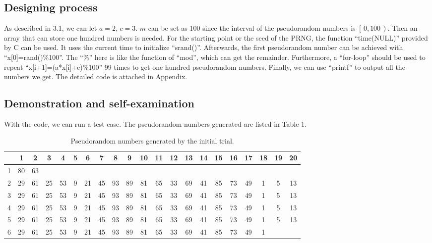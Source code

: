 \documentclass[a4paper]{article}
\begin{document}
	\subsection{Designing process}
	As described in 3.1, we can let $a=2$, $c=3$. $m$ can be set as 100 since the interval of the pseudorandom numbers is $\left[\,0,100\,\right)$. Then an array that can store one hundred numbers is needed. For the starting point or the seed of the PRNG, the function “time(NULL)” provided by C can be used. It uses the current time to initialize “srand()”. Afterwards, the first pseudorandom number can be achieved with “x[0]=rand()\%100”. The “\%” here is like the function of “mod”, which can get the remainder. Furthermore, a “for-loop” should be used to repeat “x[i+1]=(a*x[i]+c)\%100” 99 times to get one hundred pseudorandom numbers. Finally, we can use “printf” to output all the numbers we get. The detailed code is attached in Appendix.
	
	\subsection{Demonstration and self-examination}
	With the code, we can run a test case. The pseudorandom numbers generated are listed in Table 1.

\begin{table}[H]
\centering
\begin{tabular}{|c|cccccccccccccccccccc|}
\hline
  & 1  & 2  & 3  & 4  & 5 & 6  & 7  & 8  & 9  & 10 & 11 & 12 & 13 & 14 & 15 & 16 & 17 & 18 & 19 & 20 \\ \hline
1 & 80 & 63 &    &    &   &    &    &    &    &    &    &    &    &    &    &    &    &    &    &    \\
2 & 29 & 61 & 25 & 53 & 9 & 21 & 45 & 93 & 89 & 81 & 65 & 33 & 69 & 41 & 85 & 73 & 49 & 1  & 5  & 13 \\
3 & 29 & 61 & 25 & 53 & 9 & 21 & 45 & 93 & 89 & 81 & 65 & 33 & 69 & 41 & 85 & 73 & 49 & 1  & 5  & 13 \\
4 & 29 & 61 & 25 & 53 & 9 & 21 & 45 & 93 & 89 & 81 & 65 & 33 & 69 & 41 & 85 & 73 & 49 & 1  & 5  & 13 \\
5 & 29 & 61 & 25 & 53 & 9 & 21 & 45 & 93 & 89 & 81 & 65 & 33 & 69 & 41 & 85 & 73 & 49 & 1  & 5  & 13 \\
6 & 29 & 61 & 25 & 53 & 9 & 21 & 45 & 93 & 89 & 81 & 65 & 33 & 69 & 41 & 85 & 73 & 49 & 1  &    &    \\ \hline
\end{tabular}
\caption{Pseudorandom numbers generated by the initial trial.}
\end{table}
\end{document}
